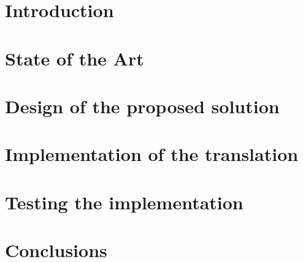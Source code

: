 \documentclass[12pt, oneside]{book}
\begin{document}




\chapter{Introduction}









\chapter{State of the Art}







\chapter{Design of the proposed solution}







\chapter{Implementation of the translation}










\chapter{Testing the implementation}





\chapter{Conclusions}
\end{document}
